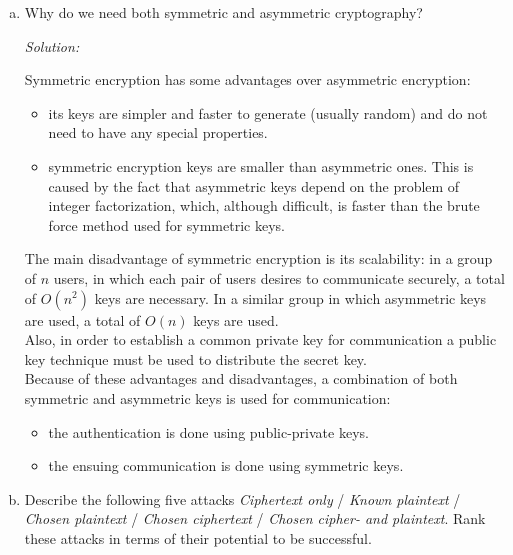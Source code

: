 \documentclass[a4paper,11pt]{article}
\newcommand{\includeonlyinsolution}[1]{\ifsolution#1\fi}
\newenvironment{solution}%
{\par{\noindent\small\textit{Solution:}}\vspace{-12pt}\begin{framed}}%
{\end{framed}\par}
\begin{document}
\begin{enumerate}[(a)]
\item Why do we need both symmetric and
   asymmetric cryptography?
  \includeonlyinsolution{\begin{solution}
  Symmetric encryption has some advantages over asymmetric encryption:
  \begin{itemize}
    \item its keys are simpler and faster to generate (usually random) and do not need to have any special properties.
    \item symmetric encryption keys are smaller than asymmetric ones. This is caused by the fact that
    asymmetric keys depend on the problem of integer factorization, which, although difficult, is faster
    than the brute force method used for symmetric keys.
  \end{itemize}
  The main disadvantage of symmetric encryption is its scalability: in a group of $n$ users, in which
  each pair of users desires to communicate securely, a total of $O(n^2)$ keys are necessary. In a
  similar group in which asymmetric keys are used, a total of $O(n)$ keys are used.\\
  Also, in order to establish a common private key for communication a public key technique must
  be used to distribute the secret key. \\
  Because of these advantages and disadvantages, a combination of both symmetric and asymmetric
  keys is used for communication:
  \begin{itemize}
    \item the authentication is done using public-private keys.
    \item the ensuing communication is done using symmetric keys.
  \end{itemize}
\end{solution}}

\item Describe the following five attacks \emph{Ciphertext only} / \emph{Known plaintext} /
  \emph{Chosen plaintext} / \emph{Chosen ciphertext} / \emph{Chosen
    cipher- and plaintext}. Rank these attacks in terms of their potential to
  be successful.


\end{enumerate}
\end{document}
